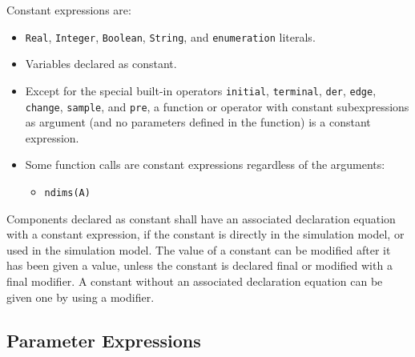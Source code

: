 Constant expressions are:
\begin{itemize}
\item
  \lstinline!Real!, \lstinline!Integer!, \lstinline!Boolean!, \lstinline!String!, and \lstinline!enumeration! literals.
\item
  Variables declared as constant.
\item
  Except for the special built-in operators \lstinline!initial!, \lstinline!terminal!, \lstinline!der!,
  \lstinline!edge!, \lstinline!change!, \lstinline!sample!, and \lstinline!pre!, a function or operator with constant
  subexpressions as argument (and no parameters defined in the function)
  is a constant expression.
\item
  Some function calls are constant expressions regardless of the arguments:
  \begin{itemize}
  \item
    \lstinline!ndims(A)!
  \end{itemize}
\end{itemize}

Components declared as constant shall have an associated declaration
equation with a constant expression, if the constant is directly in the
simulation model, or used in the simulation model. The value of a
constant can be modified after it has been given a value, unless the
constant is declared final or modified with a final modifier. A constant
without an associated declaration equation can be given one by using a
modifier.

\subsection{Parameter Expressions}\label{parameter-expressions}

